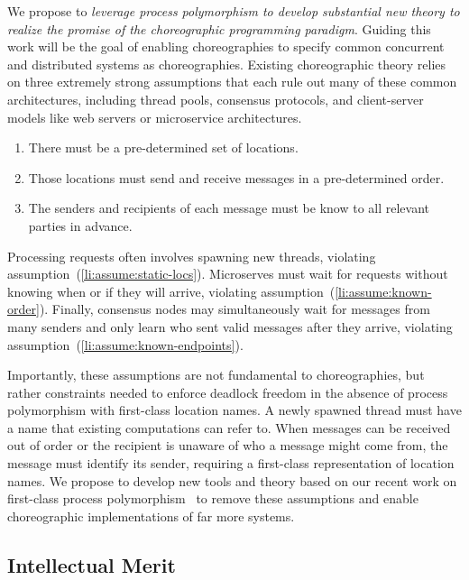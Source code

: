 We propose to \emph{leverage process polymorphism to develop substantial new theory to realize the promise of the choreographic programming paradigm}.
Guiding this work will be the goal of enabling choreographies to specify common concurrent and distributed systems as choreographies.
Existing choreographic theory relies on three extremely strong assumptions
that each rule out many of these common architectures, including thread pools, consensus protocols, and client-server models like web servers or microservice architectures.
\begin{enumerate}
  \item\label{li:assume:static-locs}
    There must be a pre-determined set of locations.
  \item\label{li:assume:known-order}
    Those locations must send and receive messages in a pre-determined order.
  \item\label{li:assume:known-endpoints}
    The senders and recipients of each message must be know to all relevant parties in advance.
\end{enumerate}
Processing requests often involves spawning new threads, violating assumption~(\ref{li:assume:static-locs}).
Microserves must wait for requests without knowing when or if they will arrive, violating assumption~(\ref{li:assume:known-order}).
Finally, consensus nodes may simultaneously wait for messages from many senders
and only learn who sent valid messages after they arrive,
violating assumption~(\ref{li:assume:known-endpoints}).

Importantly, these assumptions are not fundamental to choreographies,
but rather constraints needed to enforce deadlock freedom in the absence of process polymorphism with first-class location names.
A newly spawned thread must have a name that existing computations can refer to.
When messages can be received out of order or the recipient is unaware of who a message might come from,
the message must identify its sender, requiring a first-class representation of location names.
We propose to develop new tools and theory based on our recent work on first-class process polymorphism~\citep{SamuelsonHC25}
to remove these assumptions and enable choreographic implementations of far more systems.



\subsection{Intellectual Merit}

